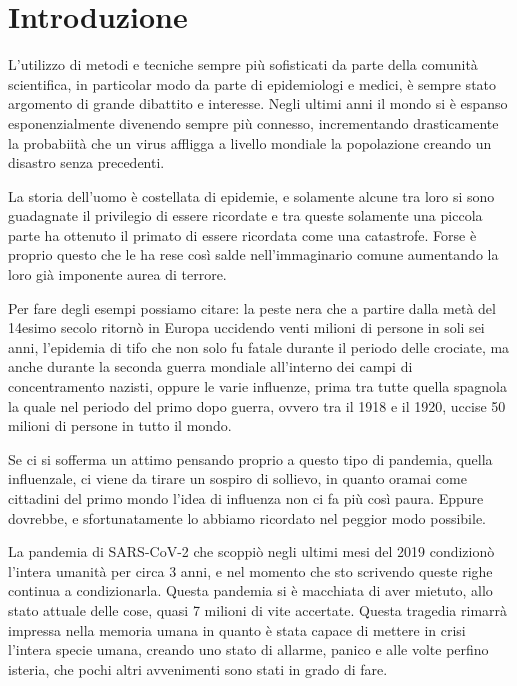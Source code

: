 \section{Introduzione}

L’utilizzo di metodi e tecniche sempre più sofisticati 
da parte della comunità scientifica, in particolar modo 
da parte di epidemiologi e medici, è sempre stato argomento 
di grande dibattito e interesse. Negli ultimi anni il mondo 
si è espanso esponenzialmente divenendo sempre più connesso,
incrementando drasticamente la probabiità che un virus 
affligga a livello mondiale la popolazione creando un 
disastro senza precedenti. 

La storia dell’uomo è costellata di epidemie, e solamente 
alcune tra loro si sono guadagnate il privilegio di essere 
ricordate e tra queste solamente una piccola parte ha ottenuto 
il primato di essere ricordata come una catastrofe. Forse 
è proprio questo che le ha rese così salde nell'immaginario 
comune aumentando la loro già imponente aurea di terrore.

Per fare degli esempi possiamo citare: la peste nera
\cite{wiki:Peste_nera} che a partire dalla 
metà del 14esimo secolo ritornò in Europa
uccidendo venti milioni di persone in soli sei anni, 
l'epidemia di tifo \cite{wiki:Tifo_esantematico} 
che non solo fu fatale durante il periodo delle crociate, 
ma anche durante la seconda guerra mondiale all'interno 
dei campi di concentramento nazisti, oppure le varie 
influenze, prima tra tutte quella spagnola \cite{wiki:Influenza_spagnola}
la quale nel periodo del primo dopo guerra, ovvero tra il 
1918 e il 1920, uccise 50 milioni di persone in tutto il mondo.

Se ci si sofferma un attimo pensando proprio a questo tipo 
di pandemia, quella influenzale, ci viene da tirare un 
sospiro di sollievo, in quanto oramai come cittadini del 
primo mondo l'idea di influenza non ci fa più così paura.
Eppure dovrebbe, e sfortunatamente lo abbiamo ricordato 
nel peggior modo possibile. 

La pandemia di SARS-CoV-2 \cite{wiki:Pandemia_di_COVID-19} 
che scoppiò negli ultimi mesi del 2019 condizionò 
l’intera umanità per circa 3 anni, e nel momento che sto 
scrivendo queste righe continua a condizionarla. 
Questa pandemia si è macchiata di aver mietuto, 
allo stato attuale delle cose, quasi 7 milioni di vite accertate. 
Questa tragedia rimarrà impressa nella memoria umana 
in quanto è stata capace di mettere in crisi l’intera 
specie umana, creando uno stato di allarme, panico e 
alle volte perfino isteria, che pochi altri avvenimenti 
sono stati in grado di fare. 

